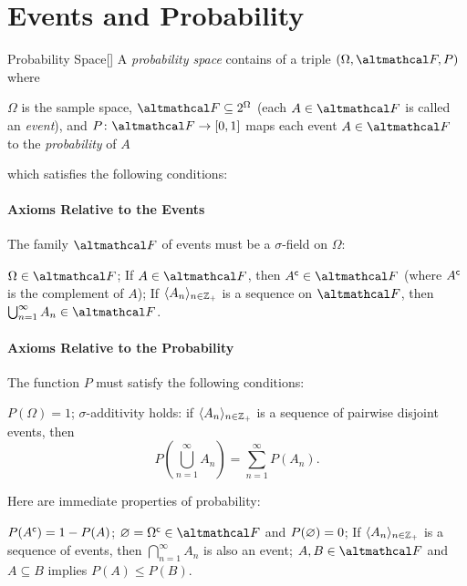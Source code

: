 \documentclass[../complex_variables_1.tex]{subfiles}
\begin{document}
\section{Events and Probability}

\begin{Definition}{Probability Space}[]
    A \emph{probability space} contains of a triple \((\Omega, \mcal{F}, P)\)
    where
    \begin{itemize}
        \ii
        \(\Omega\) is the sample space,
        \ii
        \(\mcal{F} \subseteq 2^{\Omega}\) (each \(A \in \mcal{F}\) is called an \emph{event}), and
        \ii
        \(P \colon \mcal{F} \to [0, 1]\) maps each event \(A \in \mcal{F}\) to the \emph{probability} of \(A\)
    \end{itemize}
    which satisfies the following conditions:
    \paragraph*{Axioms Relative to the Events}
    The family \(\mcal{F}\) of events must be a \(\sigma\)-field on \(\Omega\):
    \begin{enumerate}[label=(\arabic*)]
        \ii \(\Omega \in \mcal{F}\);
        \ii If \(A \in \mcal{F}\), then \(\cmpl A \in \mcal{F}\) (where \({A}^{\mathsf{c}}\) is the complement
        of \(A\));
        \ii If \(\lang A_n \rang_{n \in \ZZ_+}\) is a sequence on \(\mcal{F}\),
        then \(\bigcup_{n=1}^\infty A_n \in \mcal{F}\).
    \end{enumerate}
    \paragraph*{Axioms Relative to the Probability}
    The function \(P\) must satisfy the following conditions:
    \begin{enumerate}[label=(\arabic*)]
        \ii \(P(\Omega) = 1\);
        \ii \(\sigma\)-additivity holds: if \(\lang A_n \rang_{n \in \ZZ_+}\) is a sequence of
        pairwise disjoint events, then
        \[
            P\left( \bigcup_{n=1}^\infty A_n \right) = \sum_{n=1}^\infty P(A_n).
        \]
    \end{enumerate}
\end{Definition}

\begin{note}
    Here are immediate properties of probability:
    \begin{itemize}
        \ii \(P({A}^{\mathsf{c}}) = 1 - P(A)\);
        \ii \(\OO = \cmpl\Omega \in \mcal{F}\) and \(P(\varnothing) = 0\);
        \ii If \(\lang A_n \rang_{n \in \ZZ_+}\) is a sequence of events, then
        \(\bigcap_{n=1}^\infty A_n\) is also an event;
        \ii \(A, B \in \mcal{F}\) and \(A \subseteq B\) implies \(P(A) \le P(B)\).
    \end{itemize}
\end{note}
\end{document}
